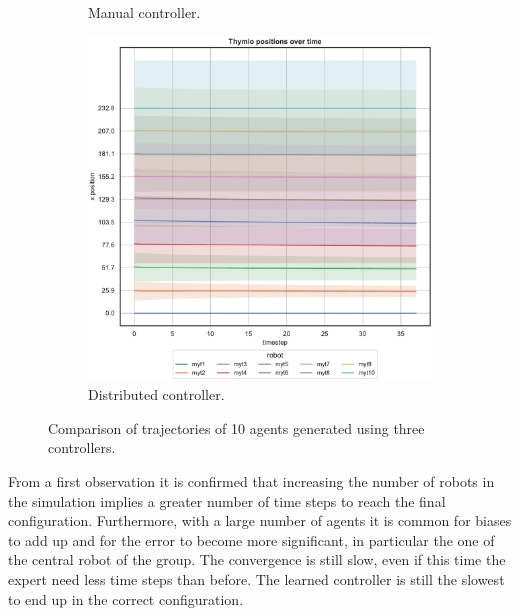 \begin{figure}[!htb]
\begin{center}
\begin{subfigure}[h]{0.325\textwidth}
		\caption{Manual controller.}
	\end{subfigure}
	\hfill
	\begin{subfigure}[h]{0.325\textwidth}
		\centering
		\includegraphics[width=\textwidth]{contents/images/net-d18/N10/position-overtime-distributed}
		\caption{Distributed controller.}
	\end{subfigure}
\end{center}
	\caption[Evaluation of the trajectories learned by \texttt{net-d18} using 10 
	agents.]{Comparison of trajectories of 10 agents generated using three 
	controllers.}
	\label{fig:net-d18traj10}
\end{figure}

\noindent
From a first observation it is confirmed that increasing the number of robots in 
the simulation implies a greater number of time steps to reach the final 
configuration.
Furthermore, with a large number of agents it is common for biases to add up 
and for the error to become more significant, in particular the one of the central 
robot of the group.
The convergence is still slow, even if this time the expert need less time steps than 
before. The learned controller is still the slowest to end up in the correct 
configuration.


